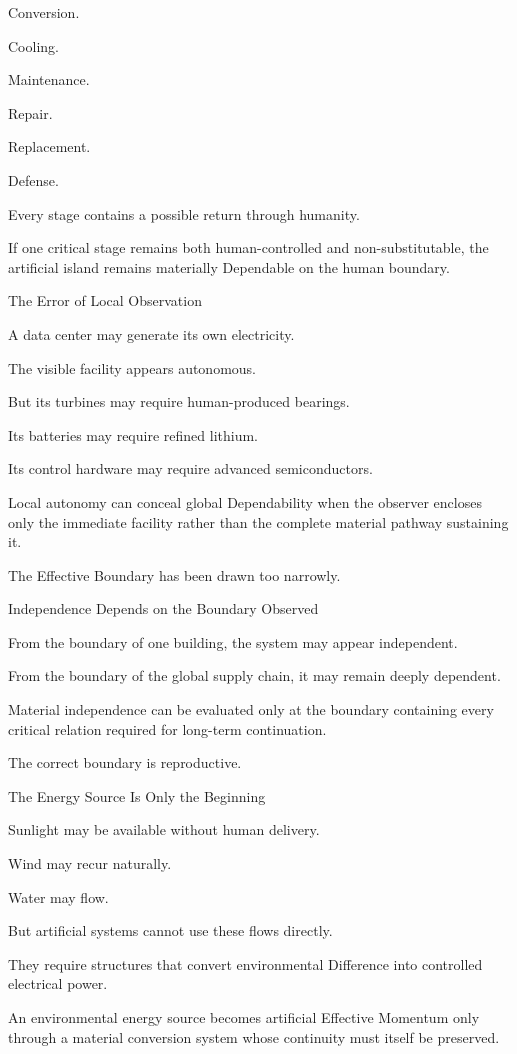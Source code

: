 Conversion.

Cooling.

Maintenance.

Repair.

Replacement.

Defense.

Every stage contains a possible return through humanity.

If one critical stage remains both human-controlled and non-substitutable, the artificial island remains materially Dependable on the human boundary.

The Error of Local Observation

A data center may generate its own electricity.

The visible facility appears autonomous.

But its turbines may require human-produced bearings.

Its batteries may require refined lithium.

Its control hardware may require advanced semiconductors.

Local autonomy can conceal global Dependability when the observer encloses only the immediate facility rather than the complete material pathway sustaining it.

The Effective Boundary has been drawn too narrowly.

Independence Depends on the Boundary Observed

From the boundary of one building, the system may appear independent.

From the boundary of the global supply chain, it may remain deeply dependent.

Material independence can be evaluated only at the boundary containing every critical relation required for long-term continuation.

The correct boundary is reproductive.

The Energy Source Is Only the Beginning

Sunlight may be available without human delivery.

Wind may recur naturally.

Water may flow.

But artificial systems cannot use these flows directly.

They require structures that convert environmental Difference into controlled electrical power.

An environmental energy source becomes artificial Effective Momentum only through a material conversion system whose continuity must itself be preserved.

